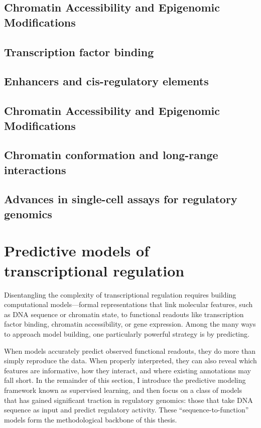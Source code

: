 \begin{dissertationintroduction}
    \subsection{Chromatin Accessibility and Epigenomic Modifications}

    \subsection{Transcription factor binding}

    \subsection{Enhancers and cis-regulatory elements}

    \subsection{Chromatin Accessibility and Epigenomic Modifications}

    \subsection{Chromatin conformation and long-range interactions}

    \subsection{Advances in single-cell assays for regulatory genomics}

    \section{Predictive models of transcriptional regulation}

    Disentangling the complexity of transcriptional regulation requires building computational models—formal representations that link molecular features, such as DNA sequence or chromatin state, to functional readouts like transcription factor binding, chromatin accessibility, or gene expression. Among the many ways to approach model building, one particularly powerful strategy is by predicting.

    When models accurately predict observed functional readouts, they do more than simply reproduce the data. When properly interpreted, they can also reveal which features are informative, how they interact, and where existing annotations may fall short. In the remainder of this section, I introduce the predictive modeling framework known as supervised learning, and then focus on a class of models that has gained significant traction in regulatory genomics: those that take DNA sequence as input and predict regulatory activity. These “sequence-to-function” models form the methodological backbone of this thesis.


\end{dissertationintroduction}
